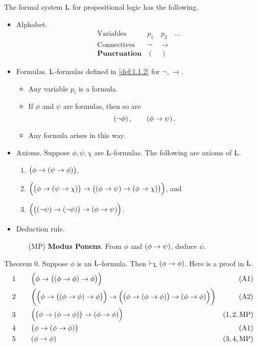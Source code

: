 \begin{definition}
The formal system $ \mathrm{L} $ for propositional logic has the following.
\begin{itemize}
\item Alphabet.
$$
\begin{array}{ll}
\text{Variables} & p_1 \quad p_2 \quad \dots \\
\text{Connectives} & \neg \quad \rightarrow \\
\textbf{Punctuation} & ( \quad )
\end{array}
$$
\item Formulas. $ \mathrm{L} $-formulas defined in \ref{def:1.1.2} for $ \neg, \rightarrow $.
\begin{itemize}
\item Any variable $ p_i $ is a formula.
\item If $ \phi $ and $ \psi $ are formulas, then so are
$$ \notb{\phi}, \qquad \impb{\phi}{\psi}. $$
\item Any formula arises in this way.
\end{itemize}
\item Axioms. Suppose $ \phi, \psi, \chi $ are $ \mathrm{L} $-formulas. The following are axioms of $ \mathrm{L} $.
\begin{enumerate}[label=(A\arabic*)]
\item $ \impb{\phi}{\impb{\psi}{\phi}} $,
\item $ \impb{\impb{\phi}{\impb{\psi}{\chi}}}{\impb{\impb{\phi}{\psi}}{\impb{\phi}{\chi}}} $, and
\item $ \impb{\impb{\notb{\psi}}{\notb{\phi}}}{\impb{\phi}{\psi}} $.
\end{enumerate}
\item Deduction rule.
\begin{itemize}
\item[(MP)] \textbf{Modus Ponens}. From $ \phi $ and $ \impb{\phi}{\psi} $, deduce $ \psi $.
\end{itemize}
\end{itemize}
\end{definition}

\begin{example}
\label{eg:1.2.3}
Theorem $ 0 $. Suppose $ \phi $ is an $ \mathrm{L} $-formula. Then $ \vdash_\L \impb{\phi}{\phi} $. Here is a proof in $ \mathrm{L} $.
\begin{align*}
1 \qquad & \impb{\phi}{\impb{\impb{\phi}{\phi}}{\phi}} & \br{\text{A1}} \\
2 \qquad & \impb{\impb{\phi}{\impb{\impb{\phi}{\phi}}{\phi}}}{\impb{\impb{\phi}{\impb{\phi}{\phi}}}{\impb{\phi}{\phi}}} & \br{\text{A2}} \\
3 \qquad & \impb{\impb{\phi}{\impb{\phi}{\phi}}}{\impb{\phi}{\phi}} & \br{1, 2, \text{MP}} \\
4 \qquad & \impb{\phi}{\impb{\phi}{\phi}} & \br{\text{A1}} \\
5 \qquad & \impb{\phi}{\phi} & \br{3, 4, \text{MP}}
\end{align*}
\end{example}

